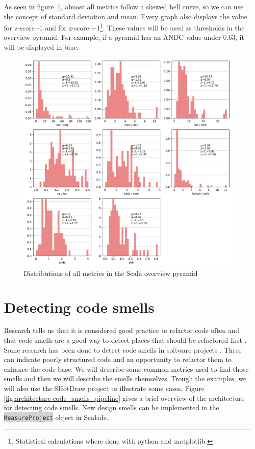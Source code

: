 \documentclass[onecolumn]{article}
\newcommand{\code}[1]{\colorbox{lightgray}{\texttt{#1}}}
\let\oldsection\section
\renewcommand\section{\clearpage\oldsection}
\begin{document}
As seen in figure~\ref{fig:all_plots_scala}, almost all metrics follow a skewed bell curve, so we can use the concept of standard deviation and mean. Every graph also displays the value for z-score -1 and for z-score +1\footnote{Statistical calculations where done with python and matplotlib.}. These values will be used as thresholds in the overview pyramid. For example, if a pyramid has an ANDC value under 0.63, it will be displayed in blue.
\begin{figure}[H]
    \centering
    \includegraphics[width=\textwidth]{fig/hist_ratios/all_plots_scala.pdf}
    \caption{Distributions of all metrics in the Scala overview pyramid}
    \label{fig:all_plots_scala}
\end{figure}

\section{Detecting code smells} \label{section_detecting_code_smells}
Research tells us that it is considered good practice to refactor code often and that code smells are a good way to detect places that should be refactored first \cite{mantyla2003taxonomy}.
Some research has been done to detect code smells in software projects \cite{van2002java}. These can indicate poorly structured code and an opportunity to refactor them to enhance the code base.
We will describe some common metrics used to find those smells and then we will describe the smells themselves. Trough the examples, we will also use the SHotDraw project to illustrate some cases. Figure \ref{fig:architecture-code_smells_pipeline} gives a brief overview of the architecture for detecting code smells. New design smells can be implemented in the \code{MeasureProject} object in Scalade.
\end{document}
